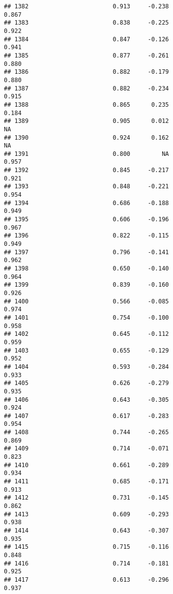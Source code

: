 \documentclass[
]{article}
\begin{document}
\begin{verbatim}
## 1382                        0.913     -0.238                     0.867
## 1383                        0.838     -0.225                     0.922
## 1384                        0.847     -0.126                     0.941
## 1385                        0.877     -0.261                     0.880
## 1386                        0.882     -0.179                     0.880
## 1387                        0.882     -0.234                     0.915
## 1388                        0.865      0.235                     0.184
## 1389                        0.905      0.012                        NA
## 1390                        0.924      0.162                        NA
## 1391                        0.800         NA                     0.957
## 1392                        0.845     -0.217                     0.921
## 1393                        0.848     -0.221                     0.954
## 1394                        0.686     -0.188                     0.949
## 1395                        0.606     -0.196                     0.967
## 1396                        0.822     -0.115                     0.949
## 1397                        0.796     -0.141                     0.962
## 1398                        0.650     -0.140                     0.964
## 1399                        0.839     -0.160                     0.926
## 1400                        0.566     -0.085                     0.974
## 1401                        0.754     -0.100                     0.958
## 1402                        0.645     -0.112                     0.959
## 1403                        0.655     -0.129                     0.952
## 1404                        0.593     -0.284                     0.933
## 1405                        0.626     -0.279                     0.935
## 1406                        0.643     -0.305                     0.924
## 1407                        0.617     -0.283                     0.954
## 1408                        0.744     -0.265                     0.869
## 1409                        0.714     -0.071                     0.823
## 1410                        0.661     -0.289                     0.934
## 1411                        0.685     -0.171                     0.913
## 1412                        0.731     -0.145                     0.862
## 1413                        0.609     -0.293                     0.938
## 1414                        0.643     -0.307                     0.935
## 1415                        0.715     -0.116                     0.848
## 1416                        0.714     -0.181                     0.925
## 1417                        0.613     -0.296                     0.937

\end{verbatim}
\end{document}
